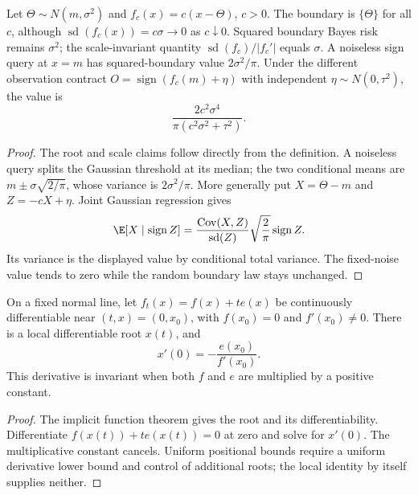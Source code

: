 \begin{counterexample}
\label{rthreegeo:scale}
Let $\Theta\sim N(m,\sigma^2)$ and $f_c(x)=c(x-\Theta)$, $c>0$.
The boundary is $\{\Theta\}$ for all $c$, although
$\operatorname{sd}(f_c(x))=c\sigma\to0$ as $c\downarrow0$.
Squared boundary Bayes risk remains $\sigma^2$; the scale-invariant
quantity $\operatorname{sd}(f_c)/|f_c'|$ equals $\sigma$.
A noiseless sign query at $x=m$ has squared-boundary value
$2\sigma^2/\pi$. Under the different observation contract
$O=\operatorname{sign}(f_c(m)+\eta)$ with independent
$\eta\sim N(0,\tau^2)$, the value is
\[
 \frac{2c^2\sigma^4}{\pi(c^2\sigma^2+\tau^2)}.
\]
\end{counterexample}
\begin{proof}
The root and scale claims follow directly from the definition.
A noiseless query splits the Gaussian threshold at its median; the two
conditional means are $m\pm\sigma\sqrt{2/\pi}$, whose variance is
$2\sigma^2/\pi$. More generally put $X=\Theta-m$ and
$Z=-cX+\eta$. Joint Gaussian regression gives
\[
 \E[X\mid\operatorname{sign}Z]
 =\frac{\operatorname{Cov}(X,Z)}{\operatorname{sd}(Z)}
   \sqrt{\frac2\pi}\operatorname{sign}Z.
\]
Its variance is the displayed value by conditional total variance.
The fixed-noise value tends to zero while the random boundary law stays
unchanged.
\end{proof}

\begin{proposition}
\label{rthreegeo:rootsensitivity}
On a fixed normal line, let $f_t(x)=f(x)+t e(x)$ be continuously
differentiable near $(t,x)=(0,x_0)$, with $f(x_0)=0$ and
$f'(x_0)\ne0$. There is a local differentiable root $x(t)$, and
\[
 x'(0)=-\frac{e(x_0)}{f'(x_0)}.
\]
This derivative is invariant when both $f$ and $e$ are multiplied by a
positive constant.
\end{proposition}
\begin{proof}
The implicit function theorem gives the root and its differentiability.
Differentiate $f(x(t))+t e(x(t))=0$ at zero and solve for $x'(0)$.
The multiplicative constant cancels. Uniform positional bounds require
a uniform derivative lower bound and control of additional roots;
the local identity by itself supplies neither.
\end{proof}


